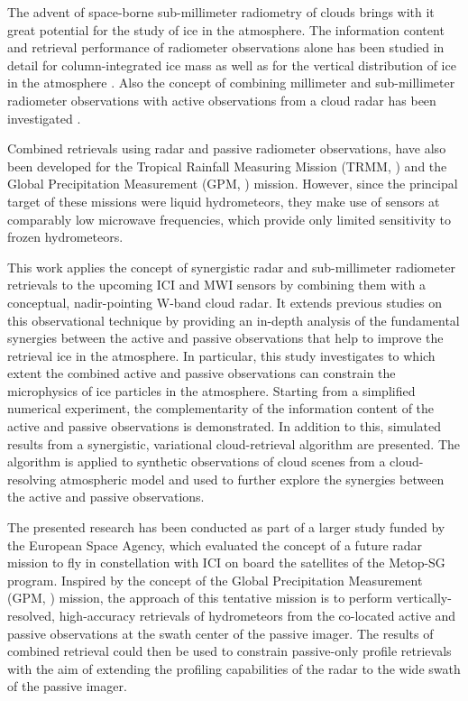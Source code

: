 \documentclass[journal abbreviation, manuscript]{copernicus}
\begin{document}
The advent of space-borne sub-millimeter radiometry of clouds brings with it
great potential for the study of ice in the atmosphere. The information content and
retrieval performance of radiometer observations alone has been studied in
detail for column-integrated ice mass \citep{jimenez07, wang17, brath18a} as
well as for the vertical distribution of ice in the atmosphere \citep{birman17, grutzun18,
  aires19}. Also the concept of combining millimeter and sub-millimeter
radiometer observations with active observations from a cloud radar has been
investigated \citep{evans05, jiang19}.

Combined retrievals using radar and passive radiometer observations, have also
been developed for the Tropical Rainfall Measuring Mission (TRMM,
\citet{kummerow98, grecu04}) and the Global Precipitation Measurement (GPM,
\cite{hou14, grecu16, munchak11}) mission. However, since the principal target
of these missions were liquid hydrometeors, they make use of sensors at
comparably low microwave frequencies, which provide only limited sensitivity to
frozen hydrometeors.

This work applies the concept of synergistic radar and sub-millimeter radiometer
retrievals to the upcoming ICI and MWI sensors by combining them with a
conceptual, nadir-pointing W-band cloud radar. It extends previous studies on
this observational technique by providing an in-depth analysis of the
fundamental synergies between the active and passive observations that help to
improve the retrieval ice in the atmosphere. In particular, this study
investigates to which extent the combined active and passive observations can
constrain the microphysics of ice particles in the atmosphere. Starting from a
simplified numerical experiment, the complementarity of the information content
of the active and passive observations is demonstrated. In addition to this,
simulated results from a synergistic, variational cloud-retrieval algorithm are
presented. The algorithm is applied to synthetic observations of cloud scenes
from a cloud-resolving atmospheric model and used to further explore the
synergies between the active and passive observations.

The presented research has been conducted as part of a larger study funded by
the European Space Agency, which evaluated the concept of a future radar mission
to fly in constellation with ICI on board the satellites of the Metop-SG
program. Inspired by the concept of the Global Precipitation Measurement (GPM,
\cite{hou14}) mission, the approach of this tentative mission is to perform
vertically-resolved, high-accuracy retrievals of hydrometeors from the
co-located active and passive observations at the swath center of the passive
imager. The results of combined retrieval could then be used to constrain
passive-only profile retrievals with the aim of extending the profiling
capabilities of the radar to the wide swath of the passive imager.
\end{document}

